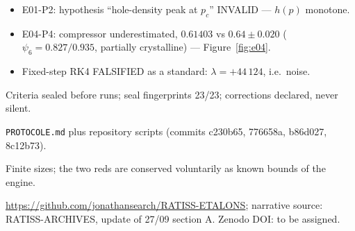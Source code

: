\documentclass[10pt]{article}
\begin{document}
\begin{itemize}
  \item E01-P2: hypothesis ``hole-density peak at $p_c$'' INVALID --- $h(p)$ monotone.
  \item E04-P4: compressor underestimated, $0.61403$ vs $0.64 \pm 0.020$
        ($\psi_6 = 0.827 / 0.935$, partially crystalline) --- Figure~\ref{fig:e04}.
  \item Fixed-step RK4 FALSIFIED as a standard: $\lambda = +44\,124$, i.e.\ noise.
\end{itemize}

Criteria sealed before runs; seal fingerprints 23/23; corrections declared, never silent.

\texttt{PROTOCOLE.md} plus repository scripts (commits c230b65, 776658a, b86d027, 8c12b73).

Finite sizes; the two reds are conserved voluntarily as known bounds of the engine.

\url{https://github.com/jonathansearch/RATISS-ETALONS};
narrative source: RATISS-ARCHIVES, update of 27/09 section A. Zenodo DOI: to be assigned.

\sourcefoot
\end{document}
